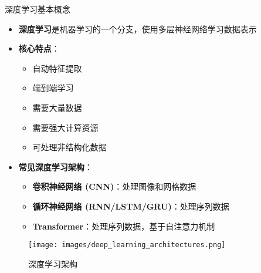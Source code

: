 \documentclass[
  ignorenonframetext,
  aspectratio=169,
  chinese-hans,
]{beamer}
\providecommand{\tightlist}{%
  \setlength{\itemsep}{0pt}\setlength{\parskip}{0pt}}\usepackage{longtable,booktabs,array}
\begin{document}
\begin{frame}{深度学习基本概念}
\label{ux6df1ux5ea6ux5b66ux4e60ux57faux672cux6982ux5ff5}
\begin{itemize}
\item
  \textbf{深度学习}是机器学习的一个分支，使用多层神经网络学习数据表示
\item
  \textbf{核心特点}：

  \begin{itemize}
  \tightlist
  \item
    自动特征提取
  \item
    端到端学习
  \item
    需要大量数据
  \item
    需要强大计算资源
  \item
    可处理非结构化数据
  \end{itemize}
\item
  \textbf{常见深度学习架构}：

  \begin{itemize}
  \tightlist
  \item
    \textbf{卷积神经网络 (CNN)}：处理图像和网格数据
  \item
    \textbf{循环神经网络 (RNN/LSTM/GRU)}：处理序列数据
  \item
    \textbf{Transformer}：处理序列数据，基于自注意力机制
  \end{itemize}
\end{itemize}

\begin{figure}[H]

{\centering \texttt{[image: images/deep\_learning\_architectures.png]}

}

\caption{深度学习架构}

\end{figure}%
\end{frame}
\end{document}
